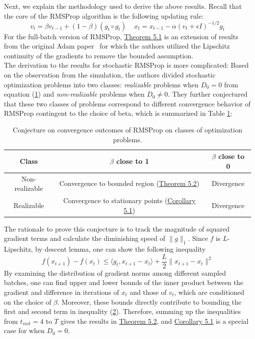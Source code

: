 \documentclass{article}
\begin{document}
Next, we explain the methodology used to derive the above results. Recall that the core of the RMSProp algorithm is the following updating rule:
\[
v_t = \beta v_{t - 1} + (1 - \beta)(g_t \circ g_t)\ \  \ \ \ x_t = x_{t - 1} - \alpha(v_t + \epsilon I)^{-1/2}g_t
\] 
For the full-batch version of RMSProp, \hyperref[theom51]{Theorem 5.1} is an extension of results from the original Adam paper~\cite{Gower2021StochasticQM} for which the authors utilized the Lipschitz continuity of the gradients to remove the bounded assumption.\\
\newline
The derivation to the results for stochastic RMSProp is more complicated: Based on the observation from the simulation, the authors divided stochastic optimization problems into two classes: \textit{realizable} problems when $D_0 = 0$ from equation (\hyperref[eq51]{1}) and  \textit{non-realizable} problems when $D_0 \neq 0$. They further conjectured that these two classes of problems correspond to different convergence behavior of RMSProp contingent to the choice of beta, which is summarized in Table \hyperref[tb1]{1}:
\begin{table}[h]
\label{tb1}
\centering
\begin{tabular}{c|c | c}
	\hline
	Class & $\beta$ close to 1 & $\beta$ close to 0\\
	\hline
	Non-realizable & Convergence to bounded region (\hyperref[theom51]{Theorem 5.2}) & Divergence\\
	Realizable & Convergence to stationary points (\hyperref[coro51]{Corollary 5.1}) & Divergence\\
	\hline
\end{tabular}
\vspace{2pt}
\caption{Conjecture on convergence outcomes of RMSProp on classes of optimization problems.}
\end{table}
\newline
The rationale to prove this conjecture is to track the magnitude of squared gradient terms and calculate the diminishing speed of $\|g\|_1$. Since $f$ is $L$-Lipschitz, by descent lemma, one can show the following inequality
\begin{equation}
\label{eq52}
f(x_{t + 1}) - f(x_{t}) \leq \langle g_t, x_{t + 1} - x_{t}\rangle + \frac{L}{2}\|x_{t + 1} - x_{t}\|^2
\end{equation}
By examining the distribution of gradient norms among different sampled batches, one can find upper and lower bounds of the inner product between the gradient and difference in iterations of $x_t$ and those of $v_t$, which are conditioned on the choice of $\beta$. Moreover, these bounds directly contribute to bounding the first and second term in inequality  (\hyperref[eq52]{2}). Therefore, summing up the inequalities from $t_{init} = 4$ to $T$ gives the results in \hyperref[theom51]{Theorem 5.2}, and \hyperref[coro51]{Corollary 5.1} is a special case for when $D_0 = 0$.
\end{document}

